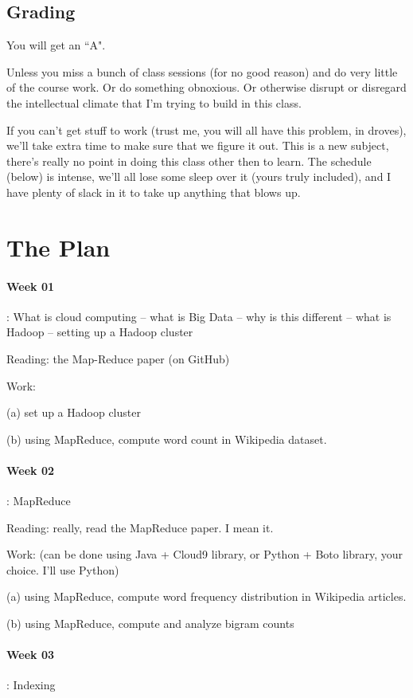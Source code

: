 \documentclass[12pt]{article}
\begin{document}
\subsection{Grading}

You will get an ``A". 

Unless you miss a bunch of class sessions (for no good reason) and do very little of the course work. Or do something obnoxious. Or otherwise disrupt or disregard the intellectual climate that I'm trying to build in this class. 

If you can't get stuff to work (trust me, you will all have this problem, in droves), we'll take extra time to make sure that we figure it out. This is a new subject, there's really no point in doing this class other then to learn. The schedule (below) is intense, we'll all lose some sleep over it (yours truly included), and I have plenty of slack in it to take up anything that blows up. 

\section{The Plan}

\paragraph{Week 01}: What is cloud computing -- what is Big Data -- why is this different -- what is Hadoop -- setting up a Hadoop cluster

Reading: the Map-Reduce paper (on GitHub)

Work:

(a) set up a Hadoop cluster

(b) using MapReduce, compute word count in Wikipedia dataset.

\paragraph{Week 02}: MapReduce

Reading: really, read the MapReduce paper. I mean it. 

Work: 
(can be done using Java + Cloud9 library, or Python + Boto library, your choice. I'll use Python)

(a) using MapReduce, compute word frequency distribution in Wikipedia articles. 

(b) using MapReduce, compute and analyze bigram counts

\paragraph{Week 03}: Indexing
\end{document}
